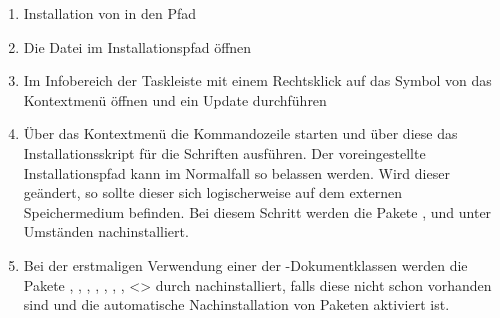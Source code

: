 \begin{enumerate}
\item Installation von  in den Pfad
\item Die Datei  im Installationspfad öffnen
\item Im Infobereich der Taskleiste mit einem Rechtsklick auf das Symbol von 
   das Kontextmenü öffnen und ein Update 
  durchführen
\item Über das Kontextmenü die Kommandozeile starten und über diese das 
  Installationsskript für die Schriften  
  ausführen. Der voreingestellte Installationspfad kann im Normalfall so 
  belassen werden. Wird dieser geändert, so sollte dieser sich logischerweise 
  auf dem externen Speichermedium befinden. Bei diesem Schritt werden die 
  Pakete ,  und  unter 
  Umständen nachinstalliert.
\item Bei der erstmaligen Verwendung einer der \TUDScript-Dokumentklassen 
  werden die Pakete , , 
  , , , 
  , , <> durch 
   nachinstalliert, falls diese nicht 
  schon vorhanden sind und die automatische Nachinstallation von Paketen 
  aktiviert ist.
\end{enumerate}

